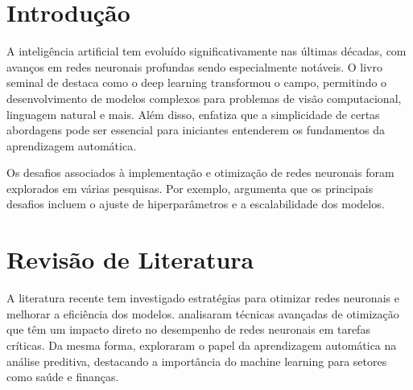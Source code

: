 


	
	
	
	
	
	
	
	
	
	
	
	
	
	
	
	\tableofcontents
	\newpage
	\listoffigures
	\newpage
	\listoftables
	\newpage
	
	
	
	\newpage
	
	\chapter{Introdução}
	A inteligência artificial tem evoluído significativamente nas últimas décadas, com avanços em redes neuronais profundas sendo especialmente notáveis. O livro seminal de \citet{goodfellow2016} destaca como o deep learning transformou o campo, permitindo o desenvolvimento de modelos complexos para problemas de visão computacional, linguagem natural e mais. Além disso, \citet{taylor2015} enfatiza que a simplicidade de certas abordagens pode ser essencial para iniciantes entenderem os fundamentos da aprendizagem automática. 
	
	Os desafios associados à implementação e otimização de redes neuronais foram explorados em várias pesquisas. Por exemplo, \citet{rao2019} argumenta que os principais desafios incluem o ajuste de hiperparâmetros e a escalabilidade dos modelos.
	
	\chapter{Revisão de Literatura}
	A literatura recente tem investigado estratégias para otimizar redes neuronais e melhorar a eficiência dos modelos. \citet{smith2021optimization} analisaram técnicas avançadas de otimização que têm um impacto direto no desempenho de redes neuronais em tarefas críticas. Da mesma forma, \citet{brown2020} exploraram o papel da aprendizagem automática na análise preditiva, destacando a importância do machine learning para setores como saúde e finanças.
	
